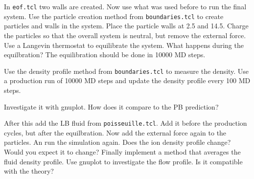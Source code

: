 In \lstinline|eof.tcl| two walls are created. Now use what was
used before to run the final system. Use the particle
creation method from \lstinline|boundaries.tcl| to
create particles and walls in the system. Place the particle
walls at 2.5 and 14.5. Charge the particles so that
the overall system is neutral, but remove the external force. 
Use a Langevin thermostat
to equilibrate the system. What happens during the equilbration?
The equilibration should be done in 10000 MD steps.

Use the density profile method from \lstinline|boundaries.tcl| 
to measure the density. Use a production run of 10000 MD steps
and update the density profile every 100 MD steps.

Investigate it with gnuplot. How does it compare to the 
PB prediction?

After this add the LB fluid from \lstinline|poisseuille.tcl|.
Add it before the production cycles, but after the equilbration.
Now add the external force again to the particles. An run the 
simulation again. Does the ion density profile change? Would
you expect it to change? Finally implement a method that averages
the fluid density profile. Use gnuplot to investigate
the flow profile. Is it compatible with the theory?














